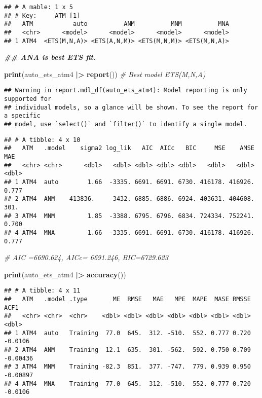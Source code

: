 \documentclass[
]{article}
\newenvironment{Shaded}{\begin{snugshade}}{\end{snugshade}}
\newcommand{\CommentTok}[1]{\textcolor[rgb]{0.56,0.35,0.01}{\textit{#1}}}
\newcommand{\DocumentationTok}[1]{\textcolor[rgb]{0.56,0.35,0.01}{\textbf{\textit{#1}}}}
\newcommand{\FunctionTok}[1]{\textcolor[rgb]{0.13,0.29,0.53}{\textbf{#1}}}
\newcommand{\NormalTok}[1]{#1}
\newcommand{\SpecialCharTok}[1]{\textcolor[rgb]{0.81,0.36,0.00}{\textbf{#1}}}
\begin{document}
\begin{verbatim}
## # A mable: 1 x 5
## # Key:     ATM [1]
##   ATM           auto          ANM          MNM          MNA
##   <chr>      <model>      <model>      <model>      <model>
## 1 ATM4  <ETS(M,N,A)> <ETS(A,N,M)> <ETS(M,N,M)> <ETS(M,N,A)>
\end{verbatim}

\begin{Shaded}
\begin{Highlighting}[]
\DocumentationTok{\#\# ANA is best ETS fit. }



\FunctionTok{print}\NormalTok{(auto\_ets\_atm4 }\SpecialCharTok{|\textgreater{}} \FunctionTok{report}\NormalTok{()) }\CommentTok{\# Best model ETS(M,N,A)}
\end{Highlighting}
\end{Shaded}

\begin{verbatim}
## Warning in report.mdl_df(auto_ets_atm4): Model reporting is only supported for
## individual models, so a glance will be shown. To see the report for a specific
## model, use `select()` and `filter()` to identify a single model.
\end{verbatim}

\begin{verbatim}
## # A tibble: 4 x 10
##   ATM   .model    sigma2 log_lik   AIC  AICc   BIC     MSE    AMSE     MAE
##   <chr> <chr>      <dbl>   <dbl> <dbl> <dbl> <dbl>   <dbl>   <dbl>   <dbl>
## 1 ATM4  auto        1.66  -3335. 6691. 6691. 6730. 416178. 416926.   0.777
## 2 ATM4  ANM    413836.    -3432. 6885. 6886. 6924. 403631. 404608. 301.   
## 3 ATM4  MNM         1.85  -3388. 6795. 6796. 6834. 724334. 752241.   0.700
## 4 ATM4  MNA         1.66  -3335. 6691. 6691. 6730. 416178. 416926.   0.777
\end{verbatim}

\begin{Shaded}
\begin{Highlighting}[]
\CommentTok{\# AIC =6690.624, AICc= 6691.246, BIC=6729.623       }

\FunctionTok{print}\NormalTok{(auto\_ets\_atm4 }\SpecialCharTok{|\textgreater{}} \FunctionTok{accuracy}\NormalTok{())}
\end{Highlighting}
\end{Shaded}

\begin{verbatim}
## # A tibble: 4 x 11
##   ATM   .model .type       ME  RMSE   MAE   MPE  MAPE  MASE RMSSE     ACF1
##   <chr> <chr>  <chr>    <dbl> <dbl> <dbl> <dbl> <dbl> <dbl> <dbl>    <dbl>
## 1 ATM4  auto   Training  77.0  645.  312. -510.  552. 0.777 0.720 -0.0106 
## 2 ATM4  ANM    Training  12.1  635.  301. -562.  592. 0.750 0.709 -0.00436
## 3 ATM4  MNM    Training -82.3  851.  377. -747.  779. 0.939 0.950 -0.00897
## 4 ATM4  MNA    Training  77.0  645.  312. -510.  552. 0.777 0.720 -0.0106
\end{verbatim}
\end{document}
